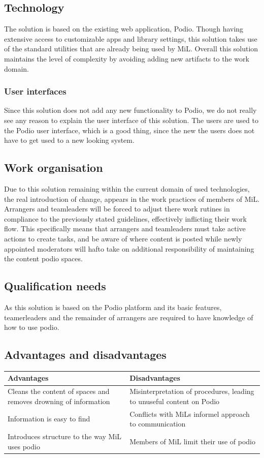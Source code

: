 \subsection{Technology}
The solution is based on the existing web application, Podio. Though having extensive access to customizable apps and library settings, this solution takes use of the standard utilities that are already being used by MiL. Overall this solution maintains the level of complexity by avoiding adding new artifacts to the work domain.

\subsubsection{User interfaces}
Since this solution does not add any new functionality to Podio, we do not really see any reason to
explain the user interface of this solution. The users are used to the Podio user interface, which
is a good thing, since the new the users does not have to get used to a new looking system.

\subsection{Work organisation}
Due to this solution remaining within the current domain of used technologies, the real introduction of change, appears in the work practices of members of MiL. Arrangers and teamleaders will be forced to adjust there work rutines in compliance to the previously stated guidelines, effectively inflicting their work flow. 
This specifically means that arrangers and teamleaders must take active actions to create tasks, and be aware of where content is posted while newly appointed moderators will hafto take on additional responsibility of maintaining the content podio spaces.

\subsection{Qualification needs}
As this solution is based on the Podio platform and its basic features, teamerleaders and the remainder of arrangers are required to have knowledge of how to use podio.  

\subsection{Advantages and disadvantages}
\begin{center}
    \begin{tabular}{ | p{7cm} | p{7cm} |}
    \hline
    \textbf{Advantages} & \textbf{Disadvantages}  \\ \hline
    Cleans the content of spaces and removes drowning of information & Misinterpretation of procedures, leading to unuseful content on Podio  \\ \hline
    Information is easy to find & Conflicts with MiLs informel approach to communication \\
    \hline
    Introduces structure to the way MiL uses podio & Members of MiL limit their use of podio \\ \hline
    \end{tabular}
\end{center}

